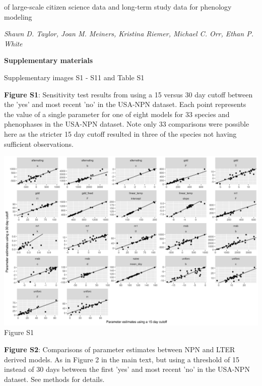 \documentclass[a4paper,12pt]{article}
\begin{document}
{\Comparison of large-scale citizen science data and long-term study data for phenology modeling \par}

\textit{Shawn D. Taylor, Joan M. Meiners, Kristina Riemer, Michael C. Orr, Ethan P. White}

\textbf{\large Supplementary materials}

Supplementary images S1 - S11 and Table S1


\newpage

\textbf{Figure S1}: Sensitivity test results from using a 15 versus 30 day cutoff between the 'yes' and most recent 'no' in the USA-NPN dataset. Each point represents the value of a single parameter for one of eight models for 33 species and phenophases in the USA-NPN dataset. Note only 33 comparisons were possible here as the stricter 15 day cutoff resulted in three of the species not having sufficient observations. 

\newpage

\begin{center}
	\centering
		\includegraphics[width=1\textwidth]{parameter_estimates_from_cutoff_sensitivity.png}
	Figure S1
\end{center}

\newpage

\newpage

\textbf{Figure S2}: Comparisons of parameter estimates between NPN and LTER derived models. As in Figure 2 in the main text, but using a threshold of 15 instead of 30 days between the first 'yes' and most recent 'no' in the USA-NPN dataset. See methods for details. 
\end{document}

